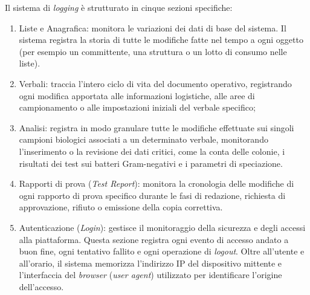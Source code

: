 Il sistema di \textit{logging} è strutturato in cinque sezioni
specifiche:
\begin{enumerate}\setlength{\itemsep}{0pt}\setlength{\parsep}{0pt}\setlength{\topsep}{0pt}\setlength{\partopsep}{0pt}
	\item Liste e Anagrafica: monitora le variazioni dei dati di base del sistema. Il sistema registra la storia di tutte le modifiche fatte nel tempo a ogni oggetto (per esempio un committente, una struttura o un lotto di consumo nelle liste).
	\item Verbali: traccia l'intero ciclo di vita del documento operativo, registrando ogni modifica apportata alle informazioni logistiche, alle aree di campionamento o alle impostazioni iniziali del verbale specifico;
	\item Analisi: registra in modo granulare tutte le modifiche effettuate sui singoli campioni biologici associati a un determinato verbale, monitorando l'inserimento o la revisione dei dati critici, come la conta delle colonie, i risultati dei test sui batteri Gram-negativi e i parametri di speciazione.
	\item Rapporti di prova (\textit{Test Report}): monitora la cronologia delle modifiche di ogni rapporto di prova specifico durante le fasi di redazione, richiesta di approvazione, rifiuto o emissione della copia correttiva.
	\item Autenticazione (\textit{Login}): gestisce il monitoraggio della sicurezza e degli accessi alla piattaforma. Questa sezione registra ogni evento di accesso andato a buon fine, ogni tentativo fallito e ogni operazione di \textit{logout}. Oltre all'utente e all'orario, il sistema memorizza l'indirizzo IP del dispositivo mittente e l'interfaccia del \textit{browser} (\textit{user agent}) utilizzato  per identificare l'origine dell'accesso.
\end{enumerate}